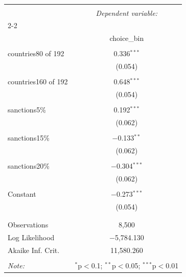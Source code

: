 
\begin{table}[H] \centering 
  \caption{} 
  \label{} 
\begin{tabular}{@{\extracolsep{5pt}}lc} 
\\[-1.8ex]\hline 
\hline \\[-1.8ex] 
 & \multicolumn{1}{c}{\textit{Dependent variable:}} \\ 
\cline{2-2} 
\\[-1.8ex] & choice\_bin \\ 
\hline \\[-1.8ex] 
 countries80 of 192 & 0.336$^{***}$ \\ 
  & (0.054) \\ 
  & \\ 
 countries160 of 192 & 0.648$^{***}$ \\ 
  & (0.054) \\ 
  & \\ 
 sanctions5\% & 0.192$^{***}$ \\ 
  & (0.062) \\ 
  & \\ 
 sanctions15\% & $-$0.133$^{**}$ \\ 
  & (0.062) \\ 
  & \\ 
 sanctions20\% & $-$0.304$^{***}$ \\ 
  & (0.062) \\ 
  & \\ 
 Constant & $-$0.273$^{***}$ \\ 
  & (0.054) \\ 
  & \\ 
\hline \\[-1.8ex] 
Observations & 8,500 \\ 
Log Likelihood & $-$5,784.130 \\ 
Akaike Inf. Crit. & 11,580.260 \\ 
\hline 
\hline \\[-1.8ex] 
\textit{Note:}  & \multicolumn{1}{r}{$^{*}$p$<$0.1; $^{**}$p$<$0.05; $^{***}$p$<$0.01} \\ 
\end{tabular} 
\end{table}  
